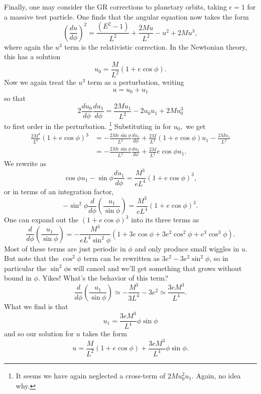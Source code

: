 Finally, one may consider the GR corrections to planetary orbits, taking $\epsilon=1$ for a massive test particle. One finds that the angular equation now takes the form
$$\left(\frac{du}{d\phi}\right)^2=\frac{(E^2-1)}{L^2}+\frac{2Mu}{L^2}-u^2+2Mu^3,$$
where again the $u^3$ term is the relativistic correction. In the Newtonian theory, this has a solution
$$u_0=\frac{M}{L^2}(1+e\cos\phi).$$
Now we again treat the $u^3$ term as a perturbation, writing
$$u=u_0+u_1$$
so that
$$2\frac{du_0}{d\phi}\frac{du_1}{d\phi}=\frac{2Mu_1}{L^2}-2u_0u_1+2Mu_0^3$$
to first order in the perturbation.%
    \footnote{It seems we have again neglected a cross-term of $2Mu_0^2 u_1$. Again, no idea why.}
Substituting in for $u_0,$ we get
\begin{align*}
    \frac{2M^4}{L^6}(1+e\cos\phi)^3&= -\frac{2Me\sin\phi}{L^2}\frac{du_1}{d\phi}+\frac{2M}{L^2}(1+e\cos\phi)u_1-\frac{2Mu_1}{L^2}\\
    &=-\frac{2Me\sin\phi}{L^2}\frac{du_1}{d\phi}+\frac{2M}{L^2}e\cos\phi u_1.
\end{align*}
We rewrite as
$$\cos\phi u_1 -\sin\phi\frac{du_1}{d\phi}=\frac{M^3}{eL^4}(1+e\cos\phi)^3,$$
or in terms of an integration factor,
$$-\sin^2\phi \frac{d}{d\phi}(\frac{u_1}{\sin\phi})=\frac{M^3}{eL^4}(1+e\cos\phi)^3.$$
One can expand out the $(1+e\cos\phi)^3$ into its three terms as
$$\frac{d}{d\phi}(\frac{u_1}{\sin\phi})=-\frac{M^3}{eL^4\sin^2\phi}(1+3e\cos\phi+3e^2\cos^2\phi+e^3\cos^3\phi).$$
Most of these terms are just periodic in $\phi$ and only produce small wiggles in $u$. But note that the $\cos^2\phi$ term can be rewritten as $3e^2-3e^2\sin^2\phi$, so in particular the $\sin^2\phi$s will cancel and we'll get something that grows without bound in $\phi$. Yikes! What's the behavior of this term?
$$\frac{d}{d\phi}(\frac{u_1}{\sin\phi})\simeq -\frac{M^3}{3L^4}-3e^2 \simeq \frac{3eM^3}{L^4}.$$
What we find is that
$$u_1=\frac{3eM^3}{L^4}\phi \sin\phi$$
and so our solution for $u$ takes the form
$$u=\frac{M}{L^2}(1+e\cos\phi)+\frac{3e M^3}{L^4}\phi\sin\phi.$$